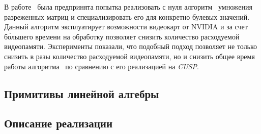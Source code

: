 В работе~\cite{inproceedings:cfqp_matrix_with_single_source} была предпринята попытка реализовать с нуля алгоритм~\cite{inproceedings:spgemm_mem_saving_for_nvidia} умножения разреженных матриц и специализировать его для конкретно булевых значений. Данный алгоритм эксплуатирует возможности  видеокарт от NVIDIA и за счет б\'ольшего времени на обработку позволяет снизить количество расходуемой видеопамяти. Эксперименты показали, что подобный подход позволяет не только снизить в разы количество расходуемой видеопамяти, но и снизить общее время работы алгоритма~\cite{inproceedings:matrix_cfpq} по сравнению с его реализацией на \textit{CUSP}. 

\subsection{Примитивы линейной алгебры}

\subsection{Описание реализации}